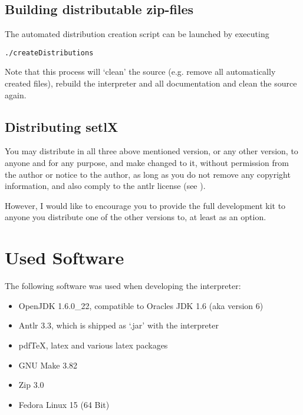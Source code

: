 \subsection{Building distributable zip-files}

The automated distribution creation script can be launched by executing

\begin{lstlisting}
./createDistributions
\end{lstlisting}

Note that this process will `clean' the source (e.g. remove all automatically created files), rebuild the interpreter and all documentation and clean the source again.

\subsection{Distributing setlX}

You may distribute \setlX{} in all three above mentioned version, or any other version, to anyone and for any purpose, and make changed to it, without permission from the author or notice to the author, as long as you do not remove any copyright information, and also comply to the antlr license (see ).

However, I would like to encourage you to provide the full development kit to anyone you distribute one of the other versions to, at least as an option.

\section{Used Software}

The following software was used when developing the \setlX{} interpreter:

\begin{itemize}
	\item OpenJDK 1.6.0\_22, compatible to Oracles JDK 1.6 (aka version 6)
	\item Antlr 3.3, which is shipped as `.jar' with the interpreter
	\item pdfTeX, latex and various latex packages
	\item GNU Make 3.82
	\item Zip 3.0
	\item Fedora Linux 15 (64 Bit)
\end{itemize}


